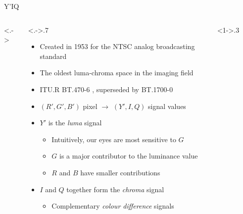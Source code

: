 \documentclass[aspectratio=169,handout,usepdftitle=false]{fireshonks}
\begin{document}
\begin{frame}{Y'IQ}
    \begin{columns}<.->
        \begin{column}<.->{.7\textwidth}
            \begin{itemize}
                \item Created in 1953 for the NTSC analog broadcasting standard
                \item The oldest luma-chroma space in the imaging field
                \item ITU.R BT.470-6 \parencite*{BT470}, superseded by BT.1700-0 \parencite*{BT1700}
                \item $(R', G', B')$ pixel $\rightarrow$ $(Y', I, Q)$ signal values
                \item $Y'$ is the \emph{luma} signal
                      \begin{itemize}
                          \item Intuitively, our eyes are most sensitive to $G$
                          \item $G$ is a major contributor to the luminance value
                          \item $R$ and $B$ have smaller contributions
                      \end{itemize}
                \item $I$ and $Q$ together form the \emph{chroma} signal
                      \begin{itemize}
                          \item Complementary \emph{colour difference} signals
                      \end{itemize}
            \end{itemize}
        \end{column}
        \begin{column}<1->{.3\textwidth}
            \begin{figure}

\end{figure}
\end{column}
\end{columns}
\end{frame}
\end{document}
